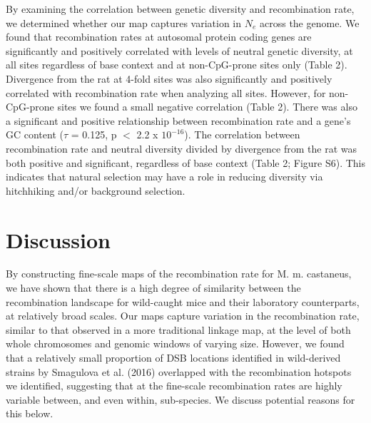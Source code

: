 	By examining the correlation between genetic diversity and recombination rate, we determined whether our map captures variation in $N_e$ across the genome. We found that recombination rates at autosomal protein coding genes are significantly and positively correlated with levels of neutral genetic diversity, at all sites regardless of base context and at non-CpG-prone sites only (Table 2). Divergence from the rat at 4-fold sites was also significantly and positively correlated with recombination rate when analyzing all sites. However, for non-CpG-prone sites we found a small negative correlation (Table 2). There was also a significant and positive relationship between recombination rate and a gene’s GC content ($\tau$ = 0.125, p $<$ 2.2 x $10^{-16}$). The correlation between recombination rate and neutral diversity divided by divergence from the rat was both positive and significant, regardless of base context (Table 2; Figure S6). This indicates that natural selection may have a role in reducing diversity via hitchhiking and/or background selection.

\section{Discussion}
 
        	By constructing fine-scale maps of the recombination rate for M. m. castaneus, we have shown that there is a high degree of similarity between the recombination landscape for wild-caught mice and their laboratory counterparts, at relatively broad scales. Our maps capture variation in the recombination rate, similar to that observed in a more traditional linkage map, at the level of both whole chromosomes and genomic windows of varying size. However, we found that a relatively small proportion of DSB locations identified in wild-derived strains by Smagulova et al. (2016) overlapped with the recombination hotspots we identified, suggesting that at the fine-scale recombination rates are highly variable between, and even within, sub-species. We discuss potential reasons for this below.
 
